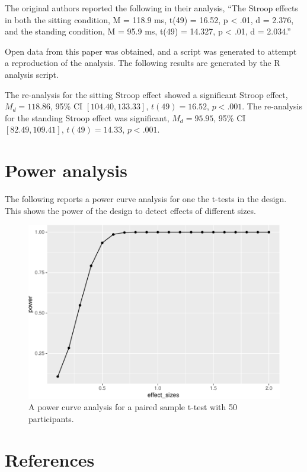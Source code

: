 \documentclass[
  man]{apa6}
\begin{document}
The original authors reported the following in their analysis, ``The Stroop effects in both the sitting condition, M = 118.9 ms, t(49) = 16.52, p \textless{} .01, d = 2.376, and the standing condition, M = 95.9 ms, t(49) = 14.327, p \textless{} .01, d = 2.034.''

Open data from this paper was obtained, and a script was generated to attempt a reproduction of the analysis. The following results are generated by the R analysis script.

The re-analysis for the sitting Stroop effect showed a significant Stroop effect, \(M_d = 118.86\), 95\% CI \([104.40, 133.33]\), \(t(49) = 16.52\), \(p < .001\). The re-analysis for the standing Stroop effect was significant, \(M_d = 95.95\), 95\% CI \([82.49, 109.41]\), \(t(49) = 14.33\), \(p < .001\).

\hypertarget{power-analysis}{%
\section{Power analysis}\label{power-analysis}}

The following reports a power curve analysis for one the t-tests in the design. This shows the power of the design to detect effects of different sizes.

\begin{figure}
\centering
\includegraphics{SemesterProject_files/figure-latex/unnamed-chunk-4-1.pdf}
\caption{\label{fig:unnamed-chunk-4}A power curve analysis for a paired sample t-test with 50 participants.}
\end{figure}

\newpage

\hypertarget{references}{%
\section{References}\label{references}}
\end{document}
